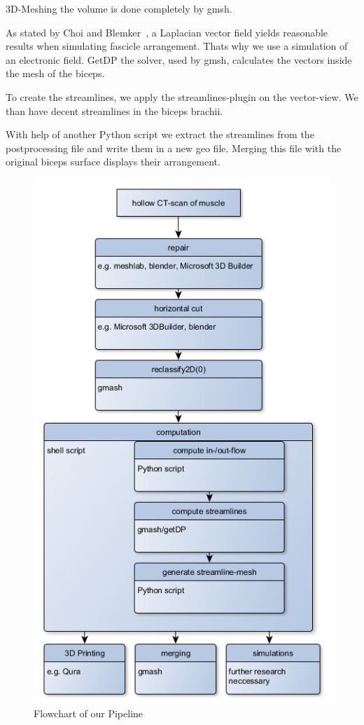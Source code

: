\documentclass[preprint,journal]{vgtc}       %
\begin{document}
3D-Meshing the volume is done completely by gmsh.
 
As stated by Choi and Blemker~\cite{Choi2013}, a Laplacian vector field yields reasonable results when simulating fascicle arrangement. Thats why we use a simulation of an electronic field. GetDP the solver, used by gmsh, calculates the vectors  inside the mesh of the biceps.

To create the streamlines, we apply the streamlines-plugin on the vector-view. We than have decent streamlines in the biceps brachii.

With help of another Python script we extract the streamlines from the postprocessing file and write them in a new geo file. Merging this file with the original biceps surface displays their arrangement.
\begin{figure}
	\begin{center}
		\includegraphics[width=.7\linewidth]{flow.png}
	\end{center}
	\caption{Flowchart of our Pipeline}
	\label{fig:flow}
	
\end{figure}
\end{document}
